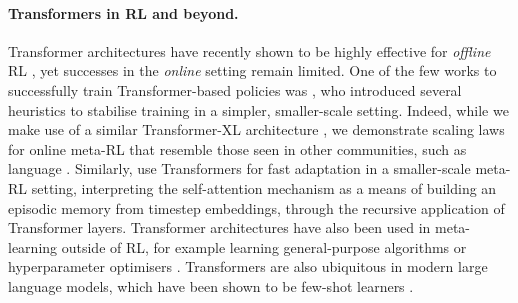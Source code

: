 \paragraph{Transformers in RL and beyond.} Transformer architectures have recently shown to be highly effective for  \emph{offline} RL \citep{chen2020decision, janner2021sequence, reed2022a}, yet successes in the \emph{online} setting remain limited. One of the few works to successfully train Transformer-based policies was \citet{parisotto2020stabilizing}, who introduced several heuristics to stabilise training in a simpler, smaller-scale setting. Indeed, while we make use of a similar Transformer-XL architecture \citep{vaswani2017attention, dai2019transformer}, we demonstrate scaling laws for online meta-RL that resemble those seen in other communities, such as language \citep{DevlinCLT19, kaplan2020scaling, brown2020gpt3, rae2021scaling}. Similarly, \citet{melo2022transformers} use Transformers for fast adaptation in a smaller-scale meta-RL setting, interpreting the self-attention mechanism as a means of building an episodic memory from timestep embeddings, through the recursive application of Transformer layers. Transformer architectures have also been used in meta-learning outside of RL, for example learning general-purpose algorithms \citep{kirsch2022general} or hyperparameter optimisers \citep{optformer}. Transformers are also ubiquitous in modern large language models, which have been shown to be few-shot learners \citep{brown2020gpt3}. 
